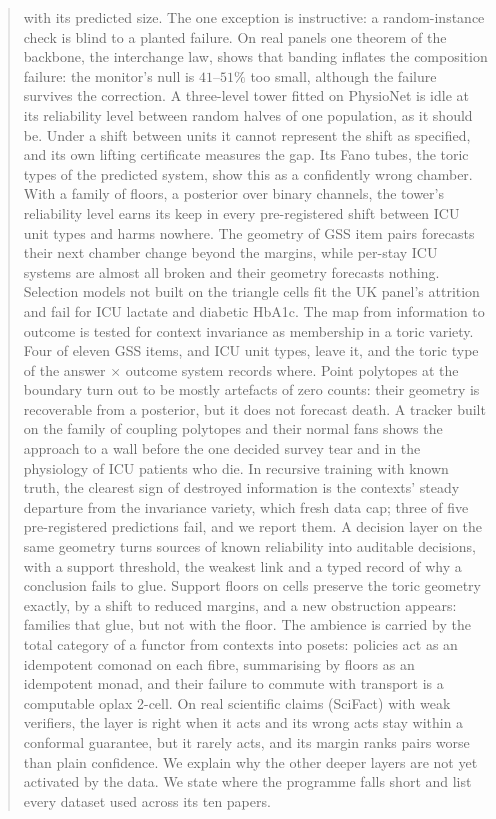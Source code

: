 \documentclass[11pt]{article}
\theoremstyle{definition}
\theoremstyle{remark}
\begin{document}
\begin{abstract}
with its predicted size. The one exception is instructive: a random-instance check is blind to a planted failure. On real panels one theorem of the backbone, the interchange law, shows that banding inflates the composition failure: the monitor's null is $41$--$51\%$ too small, although the failure survives the correction.  A three-level tower fitted on PhysioNet is idle at its reliability level between random halves of one population, as it should be. Under a shift between units it cannot represent the shift as specified, and its own lifting certificate measures the gap. Its Fano tubes, the toric types of the predicted system, show this as a confidently wrong chamber. With a family of floors, a posterior over binary channels, the tower's reliability level earns its keep in every pre-registered shift between ICU unit types and harms nowhere. The geometry of GSS item pairs forecasts their next chamber change beyond the margins, while per-stay ICU systems are almost all broken and their geometry forecasts nothing. Selection models not built on the triangle cells fit the UK panel's attrition and fail for ICU lactate and diabetic HbA1c. The map from information to outcome is tested for context invariance as membership in a toric variety. Four of eleven GSS items, and ICU unit types, leave it, and the toric type of the answer $\times$ outcome system records where. Point polytopes at the boundary turn out to be mostly artefacts of zero counts: their geometry is recoverable from a posterior, but it does not forecast death. A tracker built on the family of coupling polytopes and their normal fans shows the approach to a wall before the one decided survey tear and in the physiology of ICU patients who die. In recursive training with known truth, the clearest sign of destroyed information is the contexts' steady departure from the invariance variety, which fresh data cap; three of five pre-registered predictions fail, and we report them. A decision layer on the same geometry turns sources of known reliability into auditable decisions, with a support threshold, the weakest link and a typed record of why a conclusion fails to glue. Support floors on cells preserve the toric geometry exactly, by a shift to reduced margins, and a new obstruction appears: families that glue, but not with the floor. The ambience is carried by the total category of a functor from contexts into posets: policies act as an idempotent comonad on each fibre, summarising by floors as an idempotent monad, and their failure to commute with transport is a computable oplax 2-cell. On real scientific claims (SciFact) with weak verifiers, the layer is right when it acts and its wrong acts stay within a conformal guarantee, but it rarely acts, and its margin ranks pairs worse than plain confidence. We explain why the other deeper layers are not yet activated by the data. We state
where the programme falls short and list every dataset used across its ten papers.
\end{abstract}
\end{document}
